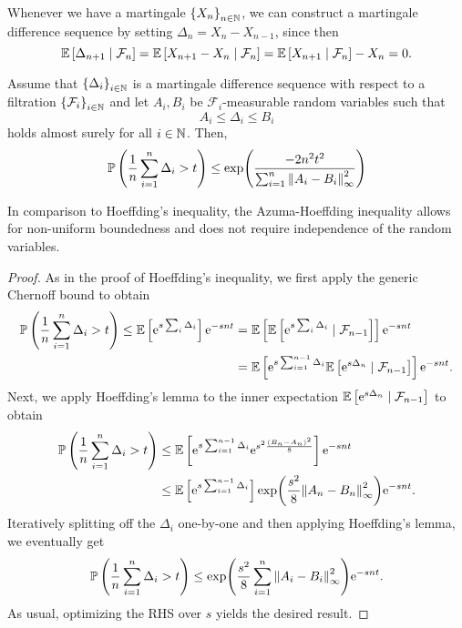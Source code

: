 Whenever we have a martingale $\left\{X_n\right\}_{n\in\mathbb{N}}$, we can construct a martingale difference sequence by setting $\Delta_n = X_n - X_{n-1}$, since then
\[
    \mathbb{E}\left[\Delta_{n+1} \mathrel{|} \mathcal{F}_n\right] = \mathbb{E}\left[X_{n+1} - X_n \mathrel{|} \mathcal{F}_n\right] = \mathbb{E}\left[X_{n+1} \mathrel{|} \mathcal{F}_n\right] - X_n = 0.
\]

\begin{theorem}
\label{thm: azuma-hoeffding}
Assume that $\left\{\Delta_i\right\}_{i\in\mathbb{N}}$ is a martingale difference sequence with respect to a filtration $\left\{\mathcal{F}_i\right\}_{i\in\mathbb{N}}$ and let $A_i, B_i$ be $\mathcal{F}_i$-measurable random variables such that
\[
    A_i \leq \Delta_i \leq B_i
\]
holds almost surely for all $i \in \mathbb{N}$. Then,
\[
    \mathbb{P}\left(\frac{1}{n}\sum_{i=1}^n \Delta_i > t\right) \leq \exp(\frac{-2n^2t^2}{\sum_{i=1}^n \norm{A_i - B_i}_\infty^2})
\]
\end{theorem}

In comparison to Hoeffding’s inequality, the Azuma-Hoeffding inequality allows for non-uniform boundedness and does not require independence of the random variables.

\begin{proof}
As in the proof of Hoeffding's inequality, we first apply the generic Chernoff bound to obtain
\begin{align*}
    \mathbb{P}\left(\frac{1}{n}\sum_{i=1}^n \Delta_i > t\right) \leq \mathbb{E}\left[\mathrm{e}^{s\sum_i \Delta_i}\right] \mathrm{e}^{-snt} &= \mathbb{E}\left[\mathbb{E}\left[\mathrm{e}^{s\sum_i \Delta_i} \mathrel{|} \mathcal{F}_{n-1}\right]\right] \mathrm{e}^{-snt} \\
        &= \mathbb{E}\left[\mathrm{e}^{s\sum_{i=1}^{n-1} \Delta_i} \mathbb{E}\left[\mathrm{e}^{s\Delta_n} \mathrel{|} \mathcal{F}_{n-1}\right]\right] \mathrm{e}^{-snt}.
\end{align*}
Next, we apply Hoeffding's lemma to the inner expectation $\mathbb{E}\left[\mathrm{e}^{s\Delta_n} \mathrel{|} \mathcal{F}_{n-1}\right]$ to obtain
\begin{align*}
    \mathbb{P}\left(\frac{1}{n}\sum_{i=1}^n \Delta_i > t\right) &\leq \mathbb{E}\left[\mathrm{e}^{s\sum_{i=1}^{n-1} \Delta_i} \mathrm{e}^{s^2\frac{(B_n - A_n)^2}{8}}\right] \mathrm{e}^{-snt} \\
        &\leq \mathbb{E}\left[\mathrm{e}^{s\sum_{i=1}^{n-1} \Delta_i}\right] \exp(\frac{s^2}{8}\norm{A_n - B_n}^2_\infty) \mathrm{e}^{-snt}.
\end{align*}
Iteratively splitting off the $\Delta_i$ one-by-one and then applying Hoeffding's lemma, we eventually get
\[
    \mathbb{P}\left(\frac{1}{n}\sum_{i=1}^n \Delta_i > t\right) \leq \exp(\frac{s^2}{8}\sum_{i=1}^n \norm{A_i - B_i}_\infty^2) \mathrm{e}^{-snt}.
\]
As usual, optimizing the RHS over $s$ yields the desired result.
\end{proof}
